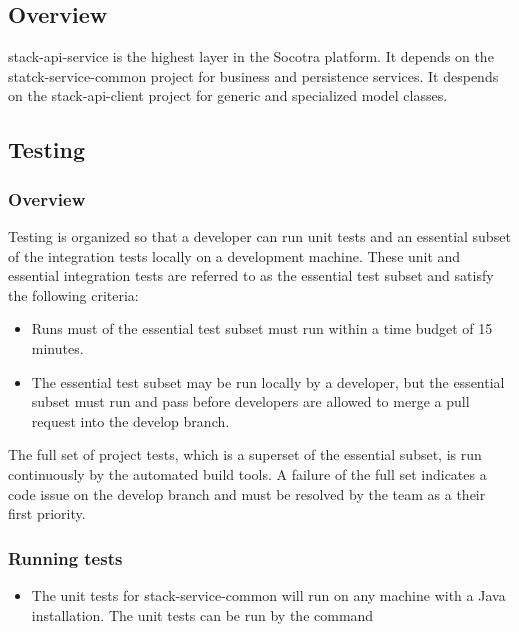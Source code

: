 \hypertarget{overview}{%
\subsection{Overview}\label{overview}}

stack-api-service is the highest layer in the Socotra platform. It
depends on the statck-service-common project for business and
persistence services. It despends on the stack-api-client project for
generic and specialized model classes.

\hypertarget{testing}{%
\subsection{Testing}\label{testing}}

\hypertarget{overview-1}{%
\subsubsection{Overview}\label{overview-1}}

Testing is organized so that a developer can run unit tests and an
essential subset of the integration tests locally on a development
machine. These unit and essential integration tests are referred to as
the essential test subset and satisfy the following criteria:

\begin{itemize}
\tightlist
\item
  Runs must of the essential test subset must run within a time budget
  of 15 minutes.
\item
  The essential test subset may be run locally by a developer, but the
  essential subset must run and pass before developers are allowed to
  merge a pull request into the develop branch.
\end{itemize}

The full set of project tests, which is a superset of the essential
subset, is run continuously by the automated build tools. A failure of
the full set indicates a code issue on the develop branch and must be
resolved by the team as a their first priority.

\hypertarget{running-tests}{%
\subsubsection{Running tests}\label{running-tests}}

\begin{itemize}
\tightlist
\item
  The unit tests for stack-service-common will run on any machine with a
  Java installation. The unit tests can be run by the command
\end{itemize}

